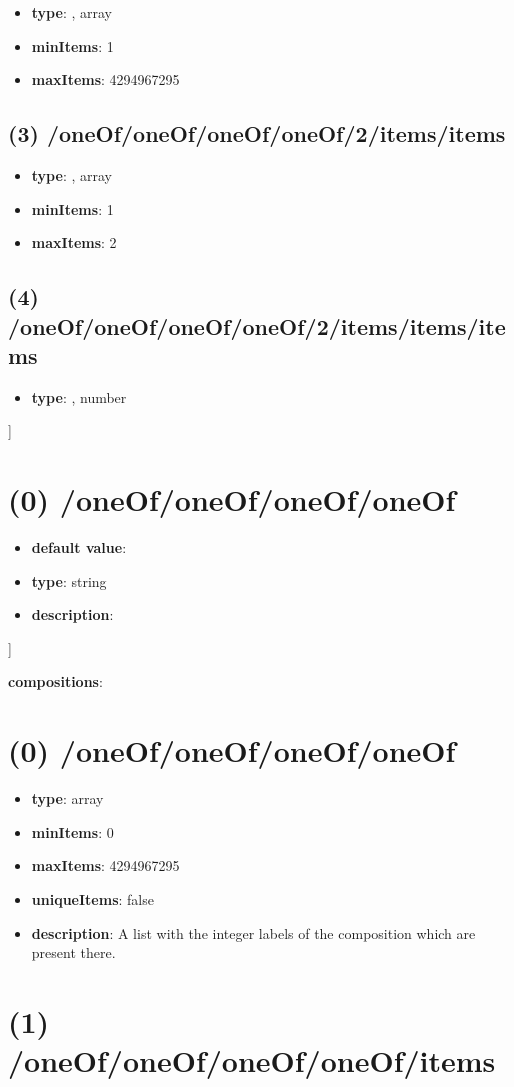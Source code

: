 \begin{itemize}[leftmargin=2em]\item {\bf type}: , array\item {\bf minItems}: 1
\item {\bf maxItems}: 4294967295
\end{itemize}\subsection{(3) /oneOf/oneOf/oneOf/oneOf/2/items/items}
\begin{itemize}[leftmargin=3em]\item {\bf type}: , array\item {\bf minItems}: 1
\item {\bf maxItems}: 2
\end{itemize}\subsection{(4) /oneOf/oneOf/oneOf/oneOf/2/items/items/items}
\begin{itemize}[leftmargin=4em]\item {\bf type}: , number\end{itemize}]\section{(0) /oneOf/oneOf/oneOf/oneOf}
\begin{itemize}[leftmargin=0em]\item {\bf default value}: 
\item {\bf type}: string
\item {\bf description}: 
\end{itemize}]\item {\bf compositions}: \section{(0) /oneOf/oneOf/oneOf/oneOf}
\begin{itemize}[leftmargin=0em]\item {\bf type}: array
\item {\bf minItems}: 0
\item {\bf maxItems}: 4294967295
\item {\bf uniqueItems}: false
\item {\bf description}: A list with the integer labels of the composition which are present there.
\end{itemize}\section{(1) /oneOf/oneOf/oneOf/oneOf/items}
